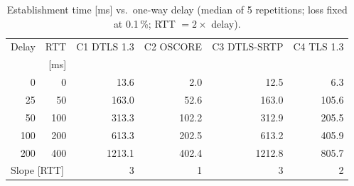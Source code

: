 \begin{table}[t]
\centering
\caption{Establishment time [ms] vs.\ one-way delay (median of 5 repetitions; loss fixed at 0.1\,\%; RTT $= 2\times$ delay).}
\label{tab:delay}
\begin{tabular}{rrrrrr}
\toprule
Delay & RTT & C1 DTLS 1.3 & C2 OSCORE & C3 DTLS-SRTP & C4 TLS 1.3 \\
[ms] & [ms] &  &  &  &  \\
\midrule
0 & 0 & 13.6 & 2.0 & 12.5 & 6.3 \\
25 & 50 & 163.0 & 52.6 & 163.0 & 105.6 \\
50 & 100 & 313.3 & 102.2 & 312.9 & 205.5 \\
100 & 200 & 613.3 & 202.5 & 613.2 & 405.9 \\
200 & 400 & 1213.1 & 402.4 & 1212.8 & 805.7 \\
\midrule
\multicolumn{2}{l}{Slope [RTT]} & 3 & 1 & 3 & 2 \\
\bottomrule
\end{tabular}
\end{table}
